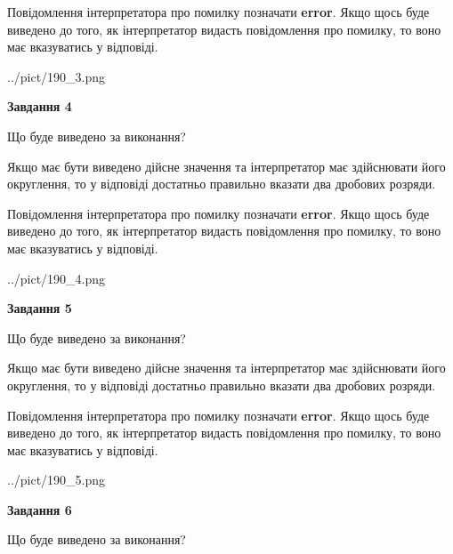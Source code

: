 \documentclass[12pt, ukrainian]{article}
\begin{document}
{\begin {Large}
Повідомлення інтерпретатора про помилку позначати \textbf{error}.
Якщо щось буде виведено до того, як інтерпретатор видасть повідомлення про помилку, 
то воно має вказуватись у відповіді. \par

\begin{center}
	{../pict/190_3.png}
\end{center}
\newpage

{\begin {center}\textbf{Завдання 4}\end {center}}\par
Що буде виведено за виконання? \par

Якщо має бути виведено дійсне значення та інтерпретатор має здійснювати його округлення, 
то у відповіді достатньо правильно вказати два дробових розряди.

Повідомлення інтерпретатора про помилку позначати \textbf{error}.
Якщо щось буде виведено до того, як інтерпретатор видасть повідомлення про помилку, 
то воно має вказуватись у відповіді. \par

\begin{center}
	{../pict/190_4.png}
\end{center}
\newpage

{\begin {center}\textbf{Завдання 5}\end {center}}\par
Що буде виведено за виконання? \par

Якщо має бути виведено дійсне значення та інтерпретатор має здійснювати його округлення, 
то у відповіді достатньо правильно вказати два дробових розряди.

Повідомлення інтерпретатора про помилку позначати \textbf{error}.
Якщо щось буде виведено до того, як інтерпретатор видасть повідомлення про помилку, 
то воно має вказуватись у відповіді. \par

\begin{center}
	{../pict/190_5.png}
\end{center}
\newpage

{\begin {center}\textbf{Завдання 6}\end {center}}\par
Що буде виведено за виконання? \par


\end{Large}}
\end{document}
